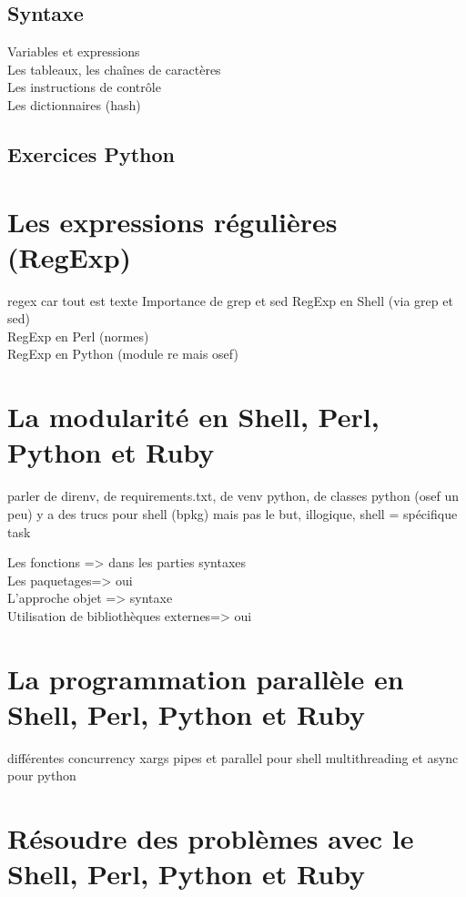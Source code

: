 \documentclass[11pt,a4paper]{article}
\begin{document}
\subsection{Syntaxe}
Variables et expressions\\
Les tableaux, les chaînes de caractères\\
Les instructions de contrôle\\
Les dictionnaires (hash)\\

\subsection{Exercices Python}



\section{Les expressions régulières (RegExp)}
regex car tout est texte
Importance de grep et sed 
RegExp en Shell (via grep et sed)\\
RegExp en Perl (normes)\\
RegExp en Python (module re mais osef)\\

\section{La modularité en Shell, Perl, Python et Ruby}

parler de direnv, de requirements.txt, de venv python, de classes python (osef un peu)
y a des trucs pour shell (bpkg) mais pas le but, illogique, shell = spécifique task

Les fonctions => dans les parties syntaxes\\
Les paquetages=> oui\\
L'approche objet => syntaxe\\
Utilisation de bibliothèques externes=> oui\\



\section{La programmation parallèle en Shell, Perl, Python et Ruby}

différentes concurrency
xargs pipes et parallel pour shell
multithreading et async pour python

\section{Résoudre des problèmes avec le Shell, Perl, Python et Ruby}
\end{document}
